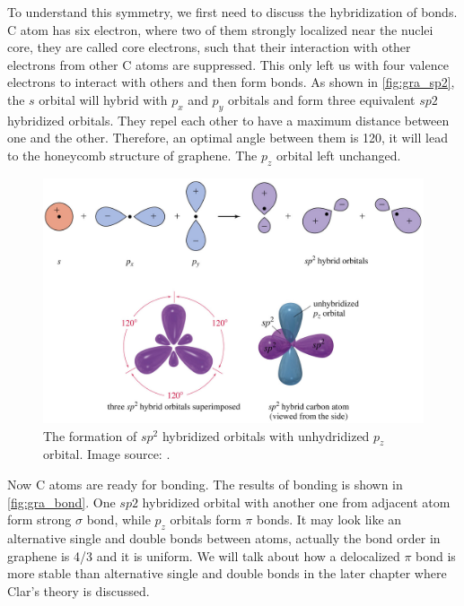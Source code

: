To understand this symmetry, we first need to discuss the hybridization of bonds. C atom has six electron, where two of them strongly localized near the nuclei core, they are called core electrons, such that their interaction with other electrons from other C atoms are suppressed. This only left us with four valence electrons to interact with others and then form bonds. As shown in \autoref{fig:gra_sp2}, the $s$ orbital will hybrid with $p_x$ and $p_y$ orbitals and form three equivalent $sp2$ hybridized orbitals. They repel each other to have a maximum distance between one and the other. Therefore, an optimal angle between them is 120\textdegree, it will lead to the honeycomb structure of graphene. The $p_z$ orbital left unchanged. 

\begin{figure}[htbp!] 
\centering  
\includegraphics[width=\textwidth]{sphybird}
\caption{The formation of $sp^2$ hybridized orbitals with unhydridized $p_z$ orbital. Image source: \cite{gra_sp2}. }  
\label{fig:gra_sp2}
\end{figure} 

Now C atoms are ready for bonding. The results of bonding is shown in \autoref{fig:gra_bond}. One $sp2$ hybridized orbital with another one from adjacent atom form strong $\sigma$ bond, while $p_z$ orbitals form $\pi$ bonds. It may look like an alternative single and double bonds between atoms, actually the bond order in graphene is 4/3 and it is uniform. We will talk about how a delocalized $\pi$ bond is more stable than alternative single and double bonds in the later chapter where Clar's theory is discussed.

